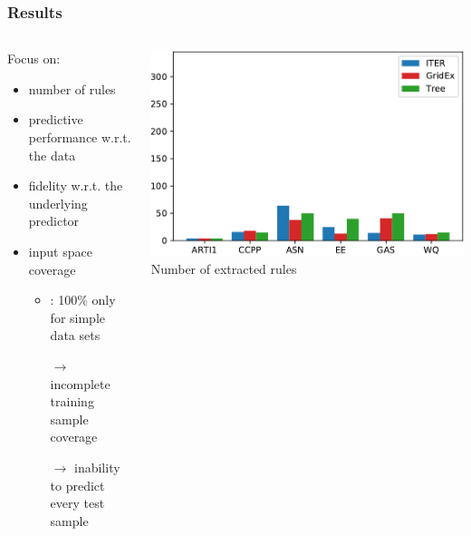 \documentclass[presentation]{beamer}
\begin{document}
\begin{frame}[allowframebreaks]
	\frametitle{Results}
	
	\begin{columns}
		\begin{column}{0.5\linewidth}
			Focus on:
			\begin{itemize}
				\item number of rules
				\item predictive performance w.r.t. the data
				\item fidelity w.r.t. the underlying predictor
				\item input space coverage
				\begin{itemize}
					\item \iter: 100\% only for simple data sets
					\item[$\rightarrow$] incomplete training sample coverage
					\item[$\rightarrow$] inability to predict every test sample
				\end{itemize}
			\end{itemize}
		\end{column}
		\begin{column}{0.5\linewidth}
			\centering
			\includegraphics[width=\columnwidth]{img/comp/rules.pdf}
			\\
			\scriptsize Number of extracted rules
		\end{column}		
	\end{columns}	

	\framebreak


\end{frame}
\end{document}

